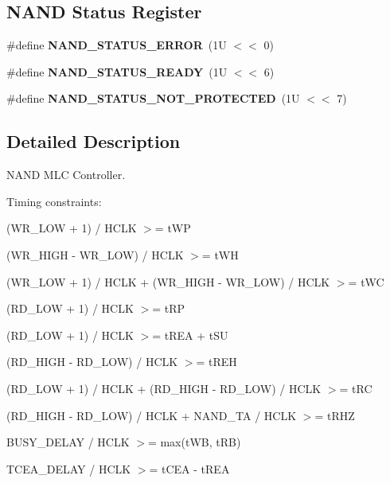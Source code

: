 \subsection*{N\+A\+ND Status Register}
\begin{DoxyCompactItemize}
\item 
\mbox{\label{group__lpc32xx__nand__mlc_gaca176d5a48af7cdfb35f44cb8f62860b}} 
\#define {\bfseries N\+A\+N\+D\+\_\+\+S\+T\+A\+T\+U\+S\+\_\+\+E\+R\+R\+OR}~(1\+U $<$$<$ 0)
\item 
\mbox{\label{group__lpc32xx__nand__mlc_gaa1daa228831240b1df9cec250fffc6b8}} 
\#define {\bfseries N\+A\+N\+D\+\_\+\+S\+T\+A\+T\+U\+S\+\_\+\+R\+E\+A\+DY}~(1\+U $<$$<$ 6)
\item 
\mbox{\label{group__lpc32xx__nand__mlc_ga6baec50094dd0065356d84d6708c7af4}} 
\#define {\bfseries N\+A\+N\+D\+\_\+\+S\+T\+A\+T\+U\+S\+\_\+\+N\+O\+T\+\_\+\+P\+R\+O\+T\+E\+C\+T\+ED}~(1\+U $<$$<$ 7)
\end{DoxyCompactItemize}


\subsection{Detailed Description}
N\+A\+ND M\+LC Controller. 

Timing constraints\+:


\begin{DoxyEnumerate}
\item (W\+R\+\_\+\+L\+OW + 1) / H\+C\+LK $>$= t\+WP
\item (W\+R\+\_\+\+H\+I\+GH -\/ W\+R\+\_\+\+L\+OW) / H\+C\+LK $>$= t\+WH
\item (W\+R\+\_\+\+L\+OW + 1) / H\+C\+LK + (W\+R\+\_\+\+H\+I\+GH -\/ W\+R\+\_\+\+L\+OW) / H\+C\+LK $>$= t\+WC
\item (R\+D\+\_\+\+L\+OW + 1) / H\+C\+LK $>$= t\+RP
\item (R\+D\+\_\+\+L\+OW + 1) / H\+C\+LK $>$= t\+R\+EA + t\+SU
\item (R\+D\+\_\+\+H\+I\+GH -\/ R\+D\+\_\+\+L\+OW) / H\+C\+LK $>$= t\+R\+EH
\item (R\+D\+\_\+\+L\+OW + 1) / H\+C\+LK + (R\+D\+\_\+\+H\+I\+GH -\/ R\+D\+\_\+\+L\+OW) / H\+C\+LK $>$= t\+RC
\item (R\+D\+\_\+\+H\+I\+GH -\/ R\+D\+\_\+\+L\+OW) / H\+C\+LK + N\+A\+N\+D\+\_\+\+TA / H\+C\+LK $>$= t\+R\+HZ
\item B\+U\+S\+Y\+\_\+\+D\+E\+L\+AY / H\+C\+LK $>$= max(t\+W\+B, t\+R\+B)
\item T\+C\+E\+A\+\_\+\+D\+E\+L\+AY / H\+C\+LK $>$= t\+C\+EA -\/ t\+R\+EA
\end{DoxyEnumerate}

